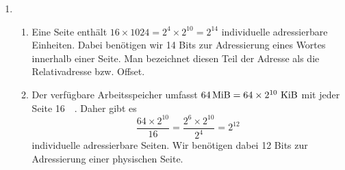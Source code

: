 \begin{enumerate}[label={Aufgabe H\arabic*},start=55]
\begin{enumerate}
\begin{figure}[h!]
                \end{figure}
        \end{enumerate}
    \item
        \begin{enumerate}
            \item Eine Seite enthält $16 \times 1024 = 2^{4} \times 2^{10} = 2^{14}$ individuelle adressierbare Einheiten. Dabei benötigen wir 14 Bits zur Adressierung eines Wortes innerhalb einer Seite. Man bezeichnet diesen Teil der Adresse als die Relativadresse bzw. Offset. 

            \item Der verfügbare Arbeitsspeicher umfasst $\SI{64}{\mebi\byte} = 64 \times 2^{10}~\SI{}{\kibi\byte}$ mit jeder Seite \SI{16}{\kibi\byte}. Daher gibt es
            \begin{equation*}
                \frac{64 \times 2^{10}}{16} = \frac{2^6 \times 2^{10}}{2^4} = 2^{12}
            \end{equation*}
            individuelle adressierbare Seiten. Wir benötigen dabei 12 Bits zur Adressierung einer physischen Seite.


\end{enumerate}
\end{enumerate}
